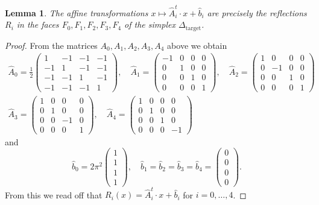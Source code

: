 \documentclass[12pt,letterpaper,reqno]{amsart}
\def\mathbf#1{#1}%
\newtheorem{lem}[thm]{Lemma}
\theoremstyle{remark}
\theoremstyle{definition}
\numberwithin{thm}{section}
\numberwithin{equation}{section}
\numberwithin{figure}{section}
\begin{document}
\begin{lem}\label{lem:affine}
	The affine transformations $\mathbf{x} \mapsto \hat{A}_i^t \cdot \mathbf{x} + \hat{b}_i$ are precisely the reflections $R_i$ in the faces $F_0, F_1, F_2, F_3, F_4$ of the simplex $\Delta_{\mathrm{target}}$.
\end{lem}

\begin{proof}
From the matrices $A_0, A_1, A_2, A_3, A_4$ above we obtain
\[
\begin{gathered}
\hat{A}_0 = \frac{1}{2}\begin{pmatrix}
 1 & -1 & -1 & -1 \\
 -1 & 1 & -1 & -1 \\
 -1 & -1 & 1 & -1 \\
 -1 & -1 & -1 & 1 	
\end{pmatrix},\quad
	\hat{A}_1 = \begin{pmatrix}
 -1 & 0 & 0 & 0 \\
 0 & 1 & 0 & 0 \\
 0 & 0 & 1 & 0 \\
 0 & 0 & 0 & 1 	
\end{pmatrix}, \quad
\hat{A}_2 = \begin{pmatrix}
 1 & 0 & 0 & 0 \\
 0 & -1 & 0 & 0 \\
 0 & 0 & 1 & 0 \\
 0 & 0 & 0 & 1 	
\end{pmatrix}\\
\hat{A}_3 = \begin{pmatrix}
 1 & 0 & 0 & 0 \\
 0 & 1 & 0 & 0 \\
 0 & 0 & -1 & 0 \\
 0 & 0 & 0 & 1 	
\end{pmatrix}, \quad
\hat{A}_4 = \begin{pmatrix}
 1 & 0 & 0 & 0 \\
 0 & 1 & 0 & 0 \\
 0 & 0 & 1 & 0 \\
 0 & 0 & 0 & -1 	
\end{pmatrix}
\end{gathered}
\]
and
\[
 \hat{b}_0 = 2 \pi^2 \begin{pmatrix}
 1 \\ 1 \\ 1 \\1 	
 \end{pmatrix}, \quad \hat{b}_1 = \hat{b}_2= \hat{b}_3 = \hat{b}_4=\begin{pmatrix}
 0 \\ 0 \\ 0 \\0 	
 \end{pmatrix}.
\]
From this we read off that $R_i(\mathbf{x})= \hat{A}_i^t \cdot \mathbf{x} + \hat{b}_i$ for $i=0, \ldots, 4$. 	
\end{proof}
\end{document}
